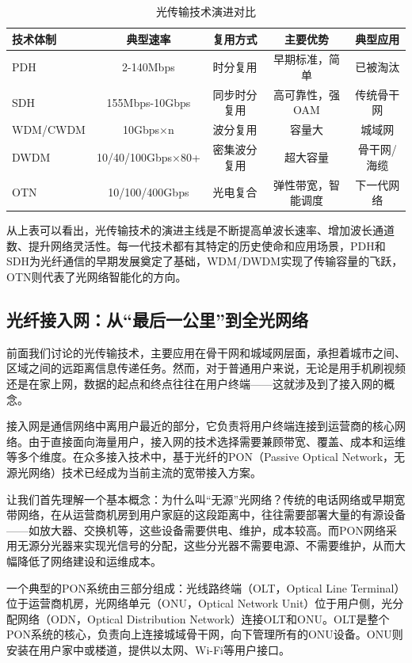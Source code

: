 \begin{table}[htbp]
\centering
\caption{光传输技术演进对比}
\begin{tabular}{|l|c|c|c|c|}
\hline
\textbf{技术体制} & \textbf{典型速率} & \textbf{复用方式} & \textbf{主要优势} & \textbf{典型应用} \\
\hline
PDH & 2-140Mbps & 时分复用 & 早期标准，简单 & 已被淘汰 \\
\hline
SDH & 155Mbps-10Gbps & 同步时分复用 & 高可靠性，强OAM & 传统骨干网 \\
\hline
WDM/CWDM & 10Gbps×n & 波分复用 & 容量大 & 城域网 \\
\hline
DWDM & 10/40/100Gbps×80+ & 密集波分复用 & 超大容量 & 骨干网/海缆 \\
\hline
OTN & 10/100/400Gbps & 光电复合 & 弹性带宽，智能调度 & 下一代网络 \\
\hline
\end{tabular}
\end{table}

从上表可以看出，光传输技术的演进主线是不断提高单波长速率、增加波长通道数、提升网络灵活性。每一代技术都有其特定的历史使命和应用场景，PDH和SDH为光纤通信的早期发展奠定了基础，WDM/DWDM实现了传输容量的飞跃，OTN则代表了光网络智能化的方向。

\subsection{光纤接入网：从“最后一公里”到全光网络}

前面我们讨论的光传输技术，主要应用在骨干网和城域网层面，承担着城市之间、区域之间的远距离信息传递任务。然而，对于普通用户来说，无论是用手机刷视频还是在家上网，数据的起点和终点往往在用户终端——这就涉及到了接入网的概念。

接入网是通信网络中离用户最近的部分，它负责将用户终端连接到运营商的核心网络。由于直接面向海量用户，接入网的技术选择需要兼顾带宽、覆盖、成本和运维等多个维度。在众多接入技术中，基于光纤的PON（Passive Optical Network，无源光网络）技术已经成为当前主流的宽带接入方案。

让我们首先理解一个基本概念：为什么叫“无源”光网络？传统的电话网络或早期宽带网络，在从运营商机房到用户家庭的这段距离中，往往需要部署大量的有源设备——如放大器、交换机等，这些设备需要供电、维护，成本较高。而PON网络采用无源分光器来实现光信号的分配，这些分光器不需要电源、不需要维护，从而大幅降低了网络建设和运维成本。

一个典型的PON系统由三部分组成：光线路终端（OLT，Optical Line Terminal）位于运营商机房，光网络单元（ONU，Optical Network Unit）位于用户侧，光分配网络（ODN，Optical Distribution Network）连接OLT和ONU。OLT是整个PON系统的核心，负责向上连接城域骨干网，向下管理所有的ONU设备。ONU则安装在用户家中或楼道，提供以太网、Wi-Fi等用户接口。

